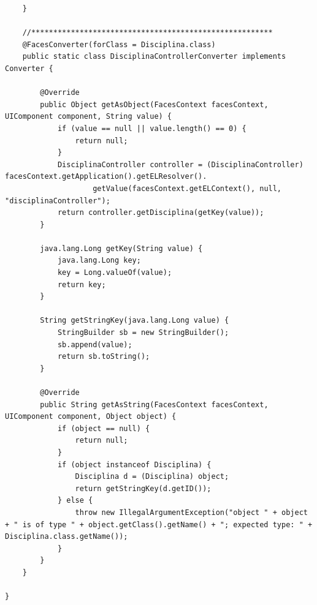 \documentclass[12pt,a4paper]{article}
\begin{document}
\begin{lstlisting}
    }

    //*******************************************************
    @FacesConverter(forClass = Disciplina.class)
    public static class DisciplinaControllerConverter implements Converter {

        @Override
        public Object getAsObject(FacesContext facesContext, UIComponent component, String value) {
            if (value == null || value.length() == 0) {
                return null;
            }
            DisciplinaController controller = (DisciplinaController) facesContext.getApplication().getELResolver().
                    getValue(facesContext.getELContext(), null, "disciplinaController");
            return controller.getDisciplina(getKey(value));
        }

        java.lang.Long getKey(String value) {
            java.lang.Long key;
            key = Long.valueOf(value);
            return key;
        }

        String getStringKey(java.lang.Long value) {
            StringBuilder sb = new StringBuilder();
            sb.append(value);
            return sb.toString();
        }

        @Override
        public String getAsString(FacesContext facesContext, UIComponent component, Object object) {
            if (object == null) {
                return null;
            }
            if (object instanceof Disciplina) {
                Disciplina d = (Disciplina) object;
                return getStringKey(d.getID());
            } else {
                throw new IllegalArgumentException("object " + object + " is of type " + object.getClass().getName() + "; expected type: " + Disciplina.class.getName());
            }
        }
    }

}
\end{lstlisting}
\end{document}
